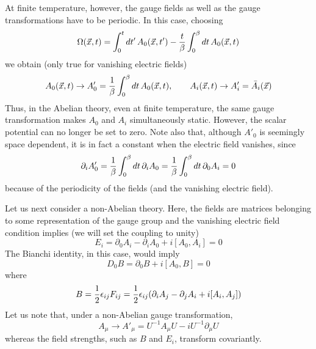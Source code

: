 \documentclass[a4paper,12pt]{article}
\begin{document}
At finite temperature, however, the gauge fields as well as the gauge
transformations have to be periodic. In this case, choosing
\begin{equation}
\Omega(\vec{x},t) = \int_{0}^{t} dt'\,A_{0}(\vec{x},t') - {t\over
\beta} \int_{0}^{\beta} dt\,A_{0}(\vec{x},t)
\end{equation}
we obtain (only true for vanishing electric fields)
\begin{equation}
A_{0}(\vec{x},t)\rightarrow A'_{0}= {1\over \beta} \int_{0}^{\beta}
dt\,A_{0}(\vec{x},t),\qquad A_{i}(\vec{x},t)\rightarrow
 A'_{i} = \bar{A}_{i}(\vec{x})
\end{equation}
Thus, in the Abelian theory, even at finite temperature, the same
gauge transformation makes $A_{0}$ and $A_{i}$ simultaneously
static. However, the scalar potential can no longer be set to
zero. Note also that, although  $A'_{0}$  is seemingly space
dependent, it is in fact a constant when the electric field vanishes,
since 
\begin{equation}
\partial_{i}A'_{0} = {1\over \beta}\int_{0}^{\beta}
dt\,\partial_{i}A_{0} = {1\over \beta} \int_{0}^{\beta}
dt\,\partial_{0}A_{i} = 0
\end{equation}
because of the periodicity of the fields (and the vanishing electric field).

Let us next consider a non-Abelian theory. Here, the fields are
matrices belonging to some representation of the gauge group and the
vanishing electric field condition implies (we will set the coupling
to unity)
\begin{equation}
E_{i} = \partial_{0}A_{i} - \partial_{i}A_{0} + i[A_{0}, A_{i}] = 0
\end{equation}
The Bianchi identity, in this case, would imply
\begin{equation}
D_{0}B = \partial_{0}B + i[A_{0},B] = 0
\end{equation}
where
\begin{equation}
B = {1\over 2} \epsilon_{ij} F_{ij} = {1\over 2}
\epsilon_{ij}(\partial_{i}A_{j}  -
\partial_{j}A_{i} + i[A_{i},A_{j}]) 
\end{equation}
Let us note that, under a non-Abelian gauge transformation,
\begin{equation}
A_{\mu}\rightarrow A'_{\mu} = U^{-1}A_{\mu}U - iU^{-1}\partial_{\mu}U
\end{equation}
whereas the field strengths, such as $B$ and $E_{i}$, transform covariantly.
\end{document}
